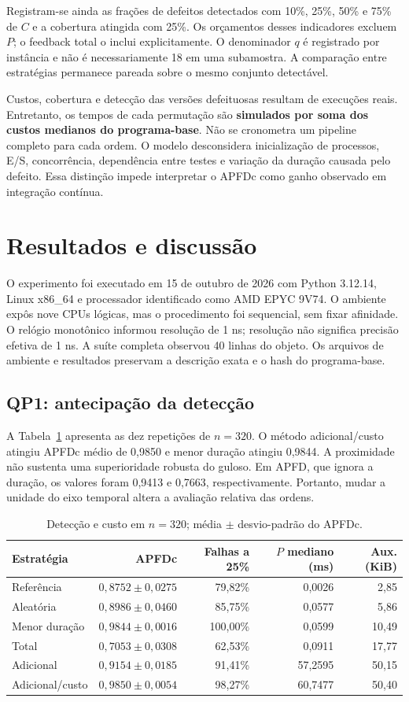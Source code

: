 \documentclass[12pt]{article}
\begin{document}
Registram-se ainda as frações de defeitos detectados com 10\%, 25\%, 50\% e 75\% de $C$ e a cobertura atingida com 25\%. Os orçamentos desses indicadores excluem $P$; o feedback total o inclui explicitamente. O denominador $q$ é registrado por instância e não é necessariamente 18 em uma subamostra. A comparação entre estratégias permanece pareada sobre o mesmo conjunto detectável.

Custos, cobertura e detecção das versões defeituosas resultam de execuções reais. Entretanto, os tempos de cada permutação são \textbf{simulados por soma dos custos medianos do programa-base}. Não se cronometra um pipeline completo para cada ordem. O modelo desconsidera inicialização de processos, E/S, concorrência, dependência entre testes e variação da duração causada pelo defeito. Essa distinção impede interpretar o APFDc como ganho observado em integração contínua.
\section{Resultados e discussão}
O experimento foi executado em 15 de outubro de 2026 com Python 3.12.14, Linux x86\_64 e processador identificado como AMD EPYC 9V74. O ambiente expôs nove CPUs lógicas, mas o procedimento foi sequencial, sem fixar afinidade. O relógio monotônico informou resolução de 1 ns; resolução não significa precisão efetiva de 1 ns. A suíte completa observou 40 linhas do objeto. Os arquivos de ambiente e resultados preservam a descrição exata e o hash do programa-base.

\subsection{QP1: antecipação da detecção}
A Tabela~\ref{tab:results} apresenta as dez repetições de $n=320$. O método adicional/custo atingiu APFDc médio de 0,9850 e menor duração atingiu 0,9844. A proximidade não sustenta uma superioridade robusta do guloso. Em APFD, que ignora a duração, os valores foram 0,9413 e 0,7663, respectivamente. Portanto, mudar a unidade do eixo temporal altera a avaliação relativa das ordens.

\begin{table}[ht]
\centering\caption{Detecção e custo em $n=320$; média $\pm$ desvio-padrão do APFDc.}\label{tab:results}
\small
\begin{tabular}{lrrrr}\toprule
Estratégia & APFDc & Falhas a 25\% & $P$ mediano (ms) & Aux. (KiB)\\\midrule
Referência & $0,8752\pm0,0275$ & 79,82\% & 0,0026 & 2,85\\
Aleatória & $0,8986\pm0,0460$ & 85,75\% & 0,0577 & 5,86\\
Menor duração & $0,9844\pm0,0016$ & 100,00\% & 0,0599 & 10,49\\
Total & $0,7053\pm0,0308$ & 62,53\% & 0,0911 & 17,77\\
Adicional & $0,9154\pm0,0185$ & 91,41\% & 57,2595 & 50,15\\
Adicional/custo & $0,9850\pm0,0054$ & 98,27\% & 60,7477 & 50,40\\\bottomrule
\end{tabular}
\end{table}
\end{document}
